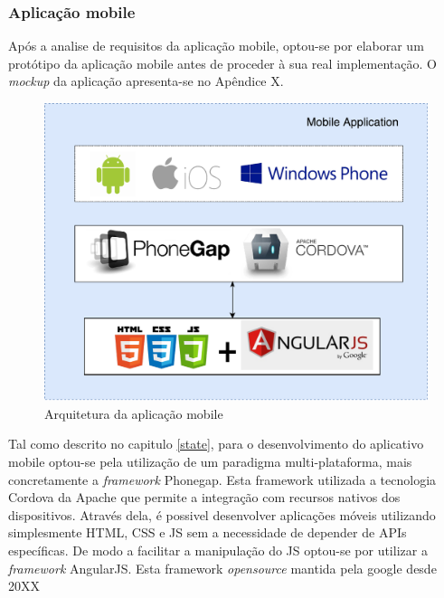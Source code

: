 












\subsubsection{Aplicação mobile}


Após a analise de requisitos da aplicação mobile, optou-se por elaborar um protótipo da aplicação mobile antes de proceder à sua real implementação. O \textit{mockup} da aplicação apresenta-se no Apêndice X. 

\begin{figure}[h]
	\centering
	\includegraphics[scale = 0.5]{esquemas/arquitetura-mobile.pdf}
	\caption{Arquitetura da aplicação mobile}
	\label{arquiteturamobile}
\end{figure}


Tal como descrito no capitulo \ref{state}, para o desenvolvimento do aplicativo mobile optou-se pela utilização de um paradigma multi-plataforma, mais concretamente a \textit{framework} Phonegap. Esta framework utilizada a tecnologia Cordova da Apache que permite a integração com recursos nativos dos dispositivos. Através dela, é possivel desenvolver aplicações móveis utilizando simplesmente \ac{HTML}, \ac{CSS} e \ac{JS} sem a necessidade de depender de APIs específicas. De modo a facilitar a manipulação do \ac{JS} optou-se por utilizar a \textit{framework} AngularJS. Esta framework \textit{opensource} mantida pela google desde 20XX 



